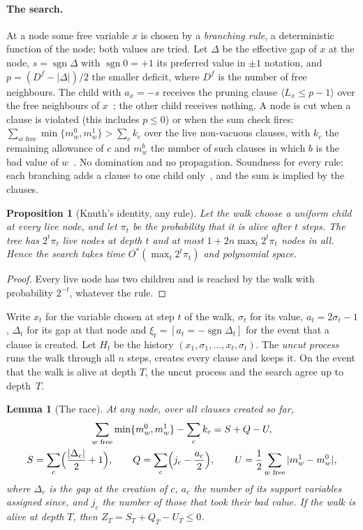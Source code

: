 \documentclass[11pt,a4paper]{article}
\newtheorem{lemma}[theorem]{Lemma}
\newtheorem{proposition}[theorem]{Proposition}
\theoremstyle{definition}
\theoremstyle{remark}
\newcommand{\Ostar}{O^{*}}
\newcommand{\sgn}{\operatorname{sgn}}
\begin{document}
\paragraph{The search.} At a node some free variable $x$ is chosen by a
\emph{branching rule}, a deterministic function of the node; both values are
tried. Let $\Delta$ be the effective gap of $x$ at the node, $s=\sgn\Delta$ with
$\sgn0=+1$ its preferred value in $\pm1$ notation, and $p=(D^f-|\Delta|)/2$ the
smaller deficit, where $D^f$ is the number of free neighbours. The child with
$a_x=-s$ receives the pruning clause $\langle L_x\le p-1\rangle$ over the free
neighbours of $x$~\cite[Section~8]{N3}; the other child receives nothing. A
node is cut when a clause is violated (this includes $p\le0$) or when the sum
check fires: $\sum_{w\text{ free}}\min\{m^0_w,m^1_w\}>\sum_ck_c$ over the live
non-vacuous clauses, with $k_c$ the remaining allowance of $c$ and $m^b_w$ the
number of such clauses in which $b$ is the bad value of $w$~\cite[Section~5]{N4}.
No domination and no propagation. Soundness for every rule: each branching
adds a clause to one child only~\cite[Proposition~20]{N3}, and the sum is
implied by the clauses.

\begin{proposition}[Knuth's identity, any rule]\label{prop:knuth}
Let the walk choose a uniform child at every live node, and let $\pi_t$ be the
probability that it is alive after $t$ steps. The tree has $2^t\pi_t$ live
nodes at depth $t$ and at most $1+2n\max_t2^t\pi_t$ nodes in all. Hence the
search takes time $\Ostar(\max_t2^t\pi_t)$ and polynomial space.
\end{proposition}

\begin{proof}
Every live node has two children and is reached by the walk with probability
$2^{-t}$, whatever the rule.
\end{proof}

Write $x_t$ for the variable chosen at step $t$ of the walk, $\sigma_t$ for its
value, $a_t=2\sigma_t-1$, $\Delta_t$ for its gap at that node and
$\xi_t=[a_t=-\sgn\Delta_t]$ for the event that a clause is created. Let
$H_{t}$ be the history $(x_1,\sigma_1,\dots,x_t,\sigma_t)$. The \emph{uncut
process} runs the walk through all $n$ steps, creates every clause and keeps
it. On the event that the walk is alive at depth $T$, the uncut process and
the search agree up to depth~$T$.

\begin{lemma}[The race]\label{lem:race}
At any node, over all clauses created so far,
\begin{gather*}
 \sum_{w\text{ free}}\min\{m^0_w,m^1_w\}-\sum_ck_c=S+Q-U,\\
 S=\sum_c\Bigl(\frac{|\Delta_c|}2+1\Bigr),\qquad
 Q=\sum_c\Bigl(j_c-\frac{a_c}2\Bigr),\qquad
 U=\frac12\sum_{w\text{ free}}|m^1_w-m^0_w|,
\end{gather*}
where $\Delta_c$ is the gap at the creation of $c$, $a_c$ the number of its
support variables assigned since, and $j_c$ the number of those that took their
bad value. If the walk is alive at depth $T$, then $Z_T=S_T+Q_T-U_T\le0$.
\end{lemma}
\end{document}
